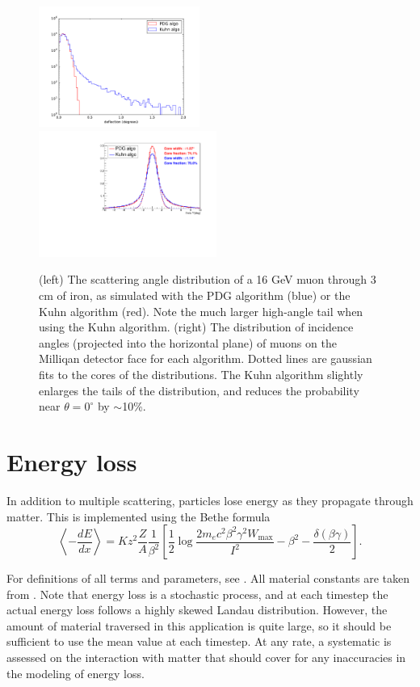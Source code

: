 \documentclass[11pt]{article}
\begin{document}
\begin{figure}
\centering
\includegraphics[width=0.47\textwidth]{plots/pdg_kuhn_single_comp.pdf}
\includegraphics[width=0.52\textwidth]{plots/pdg_kuhn_final_comp.pdf}
\caption{(left) The scattering angle distribution of a 16 GeV muon through 3 cm of iron, as simulated with the PDG algorithm (blue) or the Kuhn algorithm (red). 
Note the much larger high-angle tail when using the Kuhn algorithm.
(right) The distribution of incidence angles (projected into the horizontal plane) of muons on the Milliqan detector face for each algorithm.
Dotted lines are gaussian fits to the cores of the distributions. The Kuhn algorithm slightly
enlarges the tails of the distribution, and reduces the probability near $\theta=0^\circ$ by $\sim$10\%.}
\label{fig:msccomp}
\end{figure}

\section{Energy loss}
In addition to multiple scattering, particles lose energy as they propagate through matter. This is implemented using the 
Bethe formula
\begin{equation}\label{eq:dedx}
\left\langle-\frac{dE}{dx}\right\rangle = Kz^2\frac{Z}{A}\frac{1}{\beta^2}\left[\frac{1}{2}\log\frac{2m_ec^2\beta^2\gamma^2W_\text{max}}{I^2} - \beta^2 - \frac{\delta(\beta\gamma)}{2} \right].
\end{equation}

For definitions of all terms and parameters, see \cite{PDG_matter}. All material constants are taken from \cite{PDG_properties}.
Note that energy loss is a stochastic process, and at each timestep the actual energy loss follows a highly skewed Landau distribution.
However, the amount of material traversed in this application is quite large, so it should be sufficient to use the mean value
at each timestep. At any rate, a systematic is assessed on the interaction with matter that should cover for any inaccuracies
in the modeling of energy loss.
\end{document}
